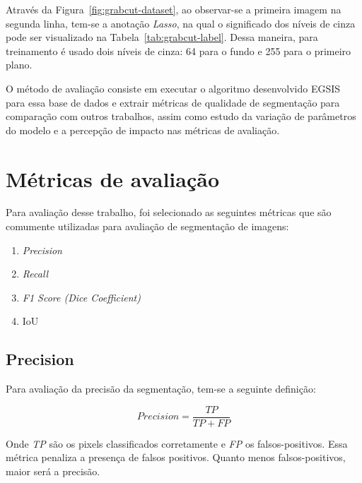Através da Figura~\ref{fig:grabcut-dataset}, ao observar-se a primeira
imagem na segunda linha, tem-se a anotação \textit{Lasso}, na qual o
significado dos níveis de cinza pode ser visualizado na
Tabela~\ref{tab:grabcut-label}. Dessa maneira, para
treinamento\footnotemark{} é usado dois níveis de cinza: 64 para o
fundo e 255 para o primeiro plano.


O método de avaliação consiste em executar o algoritmo desenvolvido
\gls{EGSIS} para essa base de dados e extrair métricas de qualidade de
segmentação para comparação com outros trabalhos, assim como estudo da
variação de parâmetros do modelo e a percepção de impacto nas métricas
de avaliação.

\section{Métricas de avaliação}\label{sec:metricas-avaliacao}

Para avaliação desse trabalho, foi selecionado as seguintes métricas
que são comumente utilizadas para avaliação de segmentação de imagens:

\begin{enumerate}
\item \textit{Precision}
\item \textit{Recall}
\item \textit{F1 Score (Dice Coefficient)}
\item IoU
\end{enumerate}


\subsection{Precision}\label{sec:precision}

Para avaliação da precisão da segmentação, tem-se a seguinte definição:

\begin{equation}\label{eq:precision}
  Precision = \dfrac{TP}{TP + FP}
\end{equation}

Onde \textit{TP} são os pixels classificados corretamente e \textit{FP}
os falsos-positivos. Essa métrica penaliza a presença de falsos
positivos. Quanto menos falsos-positivos, maior será a precisão.


